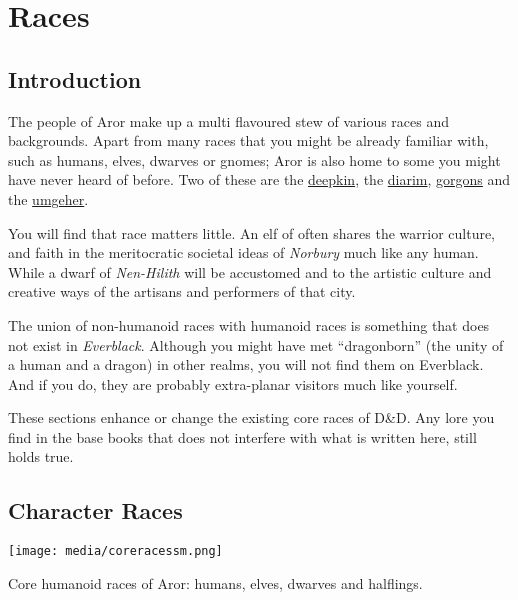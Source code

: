 \chapter{Races}
\label{sec:Races}

\section{Introduction}

The people of Aror make up a multi flavoured stew of various races and
backgrounds. Apart from many races that you might be already familiar with,
such as humans, elves, dwarves or gnomes; Aror is also home to some you might
have never heard of before. Two of these are the
\hyperref[sec:Deepkin]{deepkin}, the \hyperref[sec:Diarim]{diarim},
\hyperref[sec:Gorgons]{gorgons} and the \hyperref[sec:Umgeher]{umgeher}.

You will find that race matters little. An elf of  often
shares the warrior culture, and faith in the meritocratic societal ideas
of \emph{Norbury} much like any human. While a dwarf of \emph{Nen-Hilith} will
be accustomed and to the artistic culture and creative ways of the artisans
and performers of that city.

The union of non-humanoid races with humanoid races is something that does
not exist in \emph{Everblack}. Although you might have met ``dragonborn''
(the unity of a human and a dragon) in other realms, you will not find them
on Everblack. And if you do, they are probably extra-planar visitors much
like yourself.

\begin{note}
These sections enhance or change the existing core races of D\&D. Any lore you
find in the base books that does not interfere with what is written here, still
holds true.
\end{note}

\section{Character Races}
\label{sec:Character Races}

\begin{figure*}[ht!]
    \centering
    \vspace{-2.6cm}
    \centerline{
        \texttt{[image: media/coreracessm.png]}
    }
    \par
    Core humanoid races of Aror: humans, elves, dwarves and halflings.
\end{figure*}

